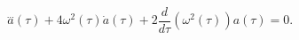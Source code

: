 \begin{equation}\label{EqOmegaTime}
\stackrel{\ldots}{a}(\tau)+4\omega^2(\tau)\dot{a}(\tau)+
2\frac{d}{d\tau}{(\omega^2(\tau))}{a}(\tau)=0.
\end{equation}

